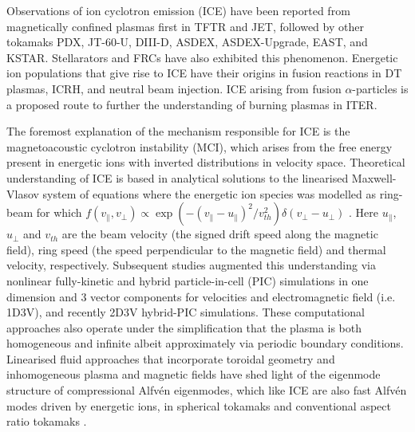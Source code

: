 \documentclass[12pt]{iopart}
\begin{document}
Observations of ion cyclotron emission (ICE) have been reported from magnetically confined plasmas first in TFTR\cite{Cauffman1995,Dendy1995} and JET\cite{Cottrell1988,Cottrell1993,Dendy1995}, followed by other tokamaks PDX\cite{Heidbrink1994}, JT-60-U\cite{Ichimura2008}, DIII-D\cite{Heidbrink2011}, ASDEX\cite{DInca2014}, ASDEX-Upgrade\cite{Ochoukov2018}, EAST\cite{Liu2020}, and KSTAR\cite{Chapman2017,Chapman2018}. Stellarators\cite{Saito2013} and FRCs\cite{Nicks2020} have also exhibited this phenomenon. Energetic ion populations that give rise to ICE have their origins in fusion reactions in DT plasmas\cite{Cottrell2000, Cauffman1995}, ICRH\cite{Cottrell2000}, and neutral beam injection\cite{Ochoukov2018}. ICE arising from fusion $\alpha$-particles is a proposed route to further the understanding of burning plasmas in ITER\cite{Dendy2015,McClements2015}. 

The foremost explanation of the mechanism responsible for ICE is the
magnetoacoustic cyclotron instability (MCI)\cite{Belikov1976}, which arises from
the free energy present in energetic ions with inverted distributions in
velocity space. Theoretical understanding of ICE is based in analytical
solutions to the linearised Maxwell-Vlasov system of equations\cite{Stix} where
the energetic ion species was modelled as ring-beam for which $f(v_\parallel,
v_\perp) \propto \exp(-(v_\parallel-u_\parallel)^2/ v_{th}^2)\delta(v_\perp -
u_\bot)$ \cite{Dendy1994, McClements1996}. Here $u_\parallel$, $u_\perp$ and
$v_{th}$ are the beam velocity (the signed drift speed along the magnetic
field), ring speed (the speed perpendicular to the magnetic field) and thermal
velocity, respectively. Subsequent studies augmented this understanding via
nonlinear fully-kinetic\cite{Cook2013,Chapman2017} and
hybrid\cite{Carbajal2014,Reman2019} particle-in-cell (PIC) simulations in one
dimension and 3 vector components for velocities and electromagnetic field (i.e.
1D3V), and recently 2D3V hybrid-PIC simulations\cite{Carbajal2021}. These
computational approaches also operate under the simplification that the plasma
is both homogeneous and infinite albeit approximately via periodic boundary
conditions. Linearised fluid approaches that incorporate toroidal geometry and
inhomogeneous plasma and magnetic fields have shed light of the eigenmode
structure of compressional Alfv{\'e}n eigenmodes, which like ICE are also fast
Alfv{\'e}n modes driven by energetic ions, in spherical
tokamaks\cite{Sharapov2014, Gorelenkov2016} and conventional aspect ratio
tokamaks \cite{Kolesnichenko2000, Fulop2000, Heidbrink2006}.
\end{document}
